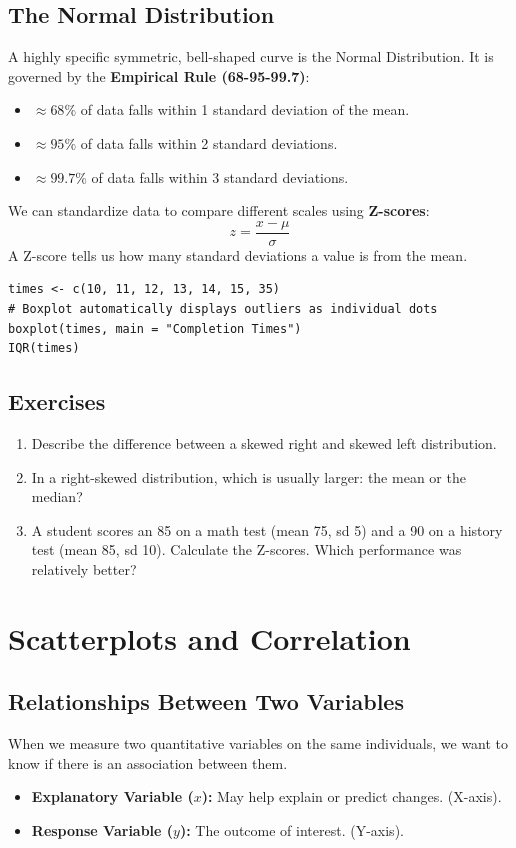 \documentclass[11pt,openany]{book}
\begin{document}
\section{The Normal Distribution}
A highly specific symmetric, bell-shaped curve is the Normal Distribution. It is governed by the \textbf{Empirical Rule (68-95-99.7)}:
\begin{itemize}
    \item $\approx 68\%$ of data falls within 1 standard deviation of the mean.
    \item $\approx 95\%$ of data falls within 2 standard deviations.
    \item $\approx 99.7\%$ of data falls within 3 standard deviations.
\end{itemize}

We can standardize data to compare different scales using \textbf{Z-scores}:
\[
z = \frac{x - \mu}{\sigma}
\]
A Z-score tells us how many standard deviations a value is from the mean.

\begin{rstudio}
\begin{lstlisting}[style=rcode]
times <- c(10, 11, 12, 13, 14, 15, 35)
# Boxplot automatically displays outliers as individual dots
boxplot(times, main = "Completion Times")
IQR(times)
\end{lstlisting}
\end{rstudio}

\section{Exercises}
\begin{enumerate}
    \item Describe the difference between a skewed right and skewed left distribution.
    \item In a right-skewed distribution, which is usually larger: the mean or the median?
    \item A student scores an 85 on a math test (mean 75, sd 5) and a 90 on a history test (mean 85, sd 10). Calculate the Z-scores. Which performance was relatively better?
\end{enumerate}

\chapter{Scatterplots and Correlation}

\section{Relationships Between Two Variables}
When we measure two quantitative variables on the same individuals, we want to know if there is an association between them.
\begin{itemize}
    \item \textbf{Explanatory Variable ($x$):} May help explain or predict changes. (X-axis).
    \item \textbf{Response Variable ($y$):} The outcome of interest. (Y-axis).
\end{itemize}
\end{document}
